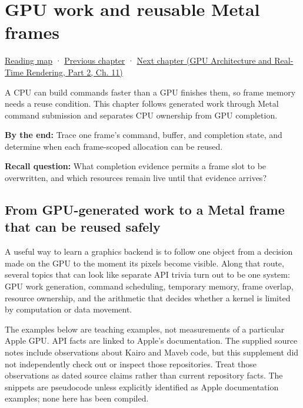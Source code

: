 \chapter{GPU work and reusable Metal frames}\label{05-engine-i-ch019-gpu-work-and-reusable-metal-frames}\hypertarget{05-engine-i-ch019}{}\label{stagechapter:05-engine-i-ch019}

\hypertarget{05-engine-i-ch019-gpu-work-and-reusable-metal-frames}{}

\hyperref[volume-reading-map]{Reading map} · \hyperref[03-visual-computing-i-ch016]{Previous chapter} · \href{../06-GPU-Architecture-and-Real-Time-Rendering-P02/main.pdf\#nameddest=05-engine-i-ch020-gpu-performance-models-and-principled-redesign}{Next chapter (GPU Architecture and Real-Time Rendering, Part 2, Ch. 11)}

A CPU can build commands faster than a GPU finishes them, so frame memory needs a reuse condition. This chapter follows generated work through Metal command submission and separates CPU ownership from GPU completion.

\textbf{By the end:} Trace one frame's command, buffer, and completion state, and determine when each frame-scoped allocation can be reused.

\textbf{Recall question:} What completion evidence permits a frame slot to be overwritten, and which resources remain live until that evidence arrives?

\section{From GPU-generated work to a Metal frame that can be reused safely}\label{05-engine-i-ch019-from-gpu-generated-work-to-a-metal-frame-that-can-be-reused-safely}

\hypertarget{05-engine-i-ch019-from-gpu-generated-work-to-a-metal-frame-that-can-be-reused-safely}{}

A useful way to learn a graphics backend is to follow one object from a decision made on the GPU to the moment its pixels become visible. Along that route, several topics that can look like separate API trivia turn out to be one system: GPU work generation, command scheduling, temporary memory, frame overlap, resource ownership, and the arithmetic that decides whether a kernel is limited by computation or data movement.

The examples below are teaching examples, not measurements of a particular Apple GPU. API facts are linked to Apple's documentation. The supplied source notes include observations about Kairo and Maveb code, but this supplement did not independently check out or inspect those repositories. Treat those observations as dated source claims rather than current repository facts. The snippets are pseudocode unless explicitly identified as Apple documentation examples; none here has been compiled.


